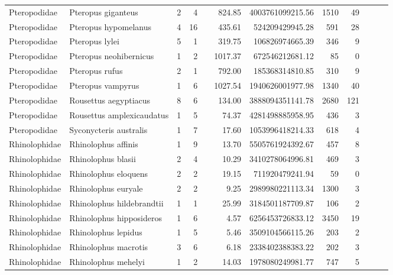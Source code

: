 \begin{landscape}
\begin{longtable}{@{}llrrrrrrrrrr@{}}
  Pteropodidae & Pteropus giganteus &   2 &   4 &  & 824.85 & 4003761099215.56 & 1510 &  49 &  &  &  \\ 
  Pteropodidae & Pteropus hypomelanus &   4 &  16 &  & 435.61 & 524209429945.28 & 591 &  28 &  &  &  \\ 
  Pteropodidae & Pteropus lylei &   5 &   1 &  & 319.75 & 106826974665.39 & 346 &   9 &  &  &  \\ 
  Pteropodidae & Pteropus neohibernicus &   1 &   2 &  & 1017.37 & 672546212681.12 &  85 &   0 &  &  &  \\ 
  Pteropodidae & Pteropus rufus &   2 &   1 &  & 792.00 & 185368314810.85 & 310 &   9 &  &  &  \\ 
  Pteropodidae & Pteropus vampyrus &   1 &   6 &  & 1027.54 & 1940626001977.98 & 1340 &  40 &  &  &  \\ 
  Pteropodidae & Rousettus aegyptiacus &   8 &   6 &  & 134.00 & 3888094351141.78 & 2680 & 121 &  &  &  \\ 
  Pteropodidae & Rousettus amplexicaudatus &   1 &   5 &  & 74.37 & 4281498885958.95 & 436 &   3 &  &  &  \\ 
  Pteropodidae & Syconycteris australis &   1 &   7 &  & 17.60 & 1053996418214.33 & 618 &   4 &  &  &  \\ 
  Rhinolophidae & Rhinolophus affinis &   1 &   9 &  & 13.70 & 5505761924392.67 & 457 &   8 &  &  &  \\ 
  Rhinolophidae & Rhinolophus blasii &   2 &   4 &  & 10.29 & 3410278064996.81 & 469 &   3 &  &  &  \\ 
  Rhinolophidae & Rhinolophus eloquens &   2 &   2 &  & 19.15 & 711920479241.94 &  59 &   0 &  &  &  \\ 
  Rhinolophidae & Rhinolophus euryale &   2 &   2 &  & 9.25 & 2989980221113.34 & 1300 &   3 &  &  &  \\ 
  Rhinolophidae & Rhinolophus hildebrandtii &   1 &   1 &  & 25.99 & 3184501187709.87 & 106 &   2 &  &  &  \\ 
  Rhinolophidae & Rhinolophus hipposideros &   1 &   6 &  & 4.57 & 6256453726833.12 & 3450 &  19 &  &  &  \\ 
  Rhinolophidae & Rhinolophus lepidus &   1 &   5 &  & 5.46 & 3509104566115.26 & 203 &   2 &  &  &  \\ 
  Rhinolophidae & Rhinolophus macrotis &   3 &   6 &  & 6.18 & 2338402388383.22 & 202 &   3 &  &  &  \\ 
  Rhinolophidae & Rhinolophus mehelyi &   1 &   2 &  & 14.03 & 1978080249981.77 & 747 &   5 &  &  &  \\ 

\end{longtable}
\end{landscape}
